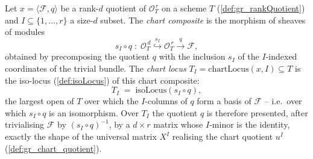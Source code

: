 \begin{definition}
  \label{def:chartLocus}
  Let \(x = \langle \mathcal{F}, q\rangle\) be a rank-\(d\) quotient of
  \(\mathcal{O}_T^{\,r}\) on a scheme \(T\) (\cref{def:gr_rankQuotient}) and \(I \subseteq
  \{1,\dots,r\}\) a size-\(d\) subset. The \emph{chart composite} is the morphism of sheaves
  of modules
  \[
    s_I \circ q
      \;:\;
    \mathcal{O}_T^{\,d}
      \overset{\ s_I\ }{\hookrightarrow} \mathcal{O}_T^{\,r}
      \xrightarrow{\ q\ } \mathcal{F},
  \]
  obtained by precomposing the quotient \(q\) with the inclusion \(s_I\) of the
  \(I\)-indexed coordinates of the trivial bundle. The \emph{chart locus}
  \(T_I = \mathrm{chartLocus}(x, I) \subseteq T\) is the iso-locus
  (\cref{def:isoLocus}) of this chart composite:
  \[
    T_I \;=\; \mathrm{isoLocus}(s_I \circ q),
  \]
  the largest open of \(T\) over which the \(I\)-columns of \(q\) form a basis of
  \(\mathcal{F}\) -- i.e.\ over which \(s_I \circ q\) is an isomorphism. Over \(T_I\) the
  quotient \(q\) is therefore presented, after trivialising \(\mathcal{F}\) by
  \((s_I \circ q)^{-1}\), by a \(d \times r\) matrix whose \(I\)-minor is the identity,
  exactly the shape of the universal matrix \(X^I\) realising the chart quotient \(u^I\)
  (\cref{def:gr_chart_quotient}).
\end{definition}

